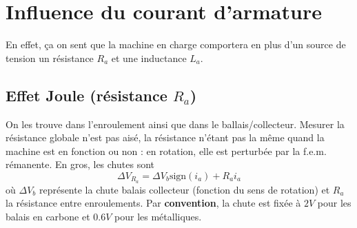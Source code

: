 			
\section{Influence du courant d'armature}
En effet, ça on sent que la machine en charge comportera en plus d'un 
source de tension un résistance $R_a$ et une inductance $L_a$.

	\subsection{Effet Joule (résistance $R_a$)}
	On les trouve dans l'enroulement ainsi que dans le ballais/collecteur. 
	Mesurer la résistance globale n'est pas aisé, la résistance n'étant 
	pas la même quand la machine est en fonction ou non : en rotation, 
	elle est perturbée par la f.e.m. rémanente. En gros, les chutes sont 
	\begin{equation}
	\Delta V_{R_a} = \Delta V_b\text{sign}(i_a) + R_ai_a
	\end{equation}
	où $\Delta V_b$ représente la chute balais collecteur (fonction du 
	sens de rotation) et $R_a$ la résistance entre enroulements. Par 
	\textbf{convention}, la chute est fixée à $2V$ pour les balais en 
	carbone et $0.6V$ pour les métalliques.
	

